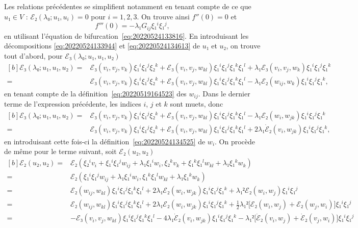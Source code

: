 \documentclass[12pt, final]{scrartcl}
\theoremstyle{definition}
\begin{document}
Les relations précédentes se simplifient notamment en tenant compte de ce que
\(u₁∈V\) : \(ℰ₂(λ₀; u₁, u_i) = 0\) pour \(i = 1, 2, 3\). On trouve ainsi
\(f''(0)=0\) et
\begin{equation}
  \label{eq:20220601055448}
  f'''(0) = -λ₁ G_{ij} ξ₁^i ξ₁^j,
\end{equation}
en utilisant l'équation de bifurcation~\eqref{eq:20220524133816}. En
introduisant les décompositions \eqref{eq:20220524133944} et
\eqref{eq:20220524134613} de \(u₁\) et \(u₂\), on trouve tout d'abord, pour
\(ℰ₃(λ₀; u₁, u₁, u₂)\)
\begin{equation*}
  \begin{aligned}[b]
    ℰ₃(λ₀; u₁, u₁, u₂)
    ={} & ℰ₃(v_i, v_j, v_k) ξ₁^i ξ₁^j ξ₂^k + ℰ₃(v_i, v_j, w_{k l}) ξ₁^i ξ₁^j ξ₁^k ξ₁^l + λ₁ ℰ₃(v_i, v_j, w_k) ξ₁^i ξ₁^j ξ₁^k \\
    ={} & ℰ₃(v_i, v_j, v_k) ξ₁^i ξ₁^j ξ₂^k + ℰ₃(v_i, v_j, w_{k l}) ξ₁^i ξ₁^j ξ₁^k ξ₁^l - λ₁ ℰ₂(w_{ij}, w_k) ξ₁^i ξ₁^j ξ₁^k,
  \end{aligned}
\end{equation*}
en tenant compte de la définition~\eqref{eq:20220519164523} des \(w_{ij}\). Dans
le dernier terme de l'expression précédente, les indices \(i\), \(j\) et \(k\)
sont muets, donc
\begin{equation*}
  \begin{aligned}[b]
    ℰ₃(λ₀; u₁, u₁, u₂)
    ={} & ℰ₃(v_i, v_j, v_k) ξ₁^i ξ₁^j ξ₂^k + ℰ₃(v_i, v_j, w_{kl}) ξ₁^i ξ₁^j ξ₁^k ξ₁^l - λ₁ ℰ₂(w_{i}, w_{jk}) ξ₁^i ξ₁^j ξ₁^k\\
    ={} & ℰ₃(v_i, v_j, v_k) ξ₁^i ξ₁^j ξ₂^k + ℰ₃(v_i, v_j, w_{kl}) ξ₁^i ξ₁^j ξ₁^k ξ₁^l + 2 λ₁ \dot{ℰ}₂(v_{i}, w_{jk}) ξ₁^i ξ₁^j ξ₁^k,
  \end{aligned}
\end{equation*}
en introduisant cette fois-ci la définition~\eqref{eq:20220524134525} de
\(w_i\). On procède de même pour le terme suivant, soit \(ℰ₂(u₂, u₂)\)
\begin{equation*}
  \begin{aligned}[b]
    ℰ₂(u₂, u₂)
    ={} & ℰ₂(ξ₂^i v_i + ξ₁^i ξ₁^j w_{i j} + λ₁ ξ₁^i w_i, ξ₂^k v_k + ξ₁^k ξ₁^l w_{k l} + λ₁ ξ₁^k w_k)\\
    ={} & ℰ₂(ξ₁^i ξ₁^j w_{i j} + λ₁ ξ₁^i w_i, ξ₁^k ξ₁^l w_{k l} + λ₁ ξ₁^k w_k)\\
    ={} & ℰ₂(w_{i j}, w_{k l}) ξ₁^i ξ₁^j ξ₁^k ξ₁^l + 2 λ₁ ℰ₂(w_i, w_{j k}) ξ₁^i ξ₁^j ξ₁^k + λ₁² ℰ₂(w_i, w_j) ξ₁^i ξ₁^j\\
    ={} & ℰ₂(w_{i j}, w_{k l}) ξ₁^i ξ₁^j ξ₁^k ξ₁^l + 2 λ₁ ℰ₂(w_i, w_{j k}) ξ₁^i ξ₁^j ξ₁^k + \tfrac{1}{2} λ₁² \bigl[ℰ₂(w_i, w_j) + ℰ₂(w_j, w_i)\bigr] ξ₁^i ξ₁^j\\
    ={} & -ℰ₃(v_i, v_j, w_{k l}) ξ₁^i ξ₁^j ξ₁^k ξ₁^l - 4 λ₁ \dot{ℰ}₂ (v_i, w_{j k}) ξ₁^i ξ₁^j ξ₁^k - λ₁² \bigl[\dot{ℰ}₂(v_i, w_j) + \dot{ℰ}₂(v_j, w_i)\bigr] ξ₁^i ξ₁^j
  \end{aligned}
\end{equation*}
\end{document}
